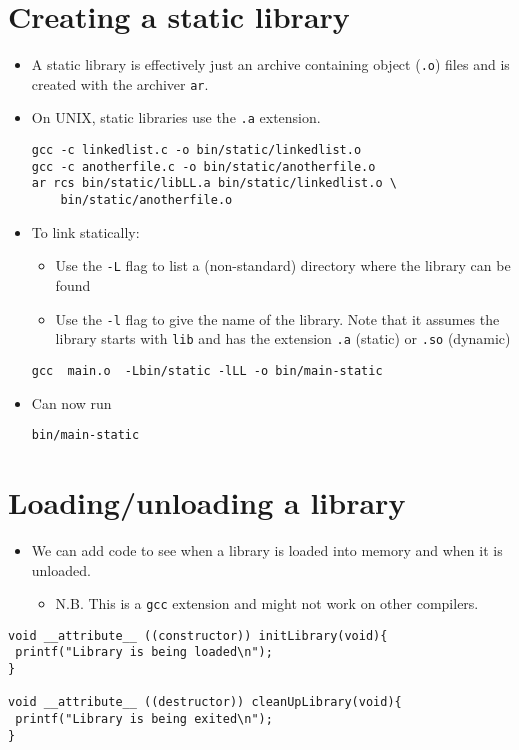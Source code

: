 \documentclass{article}
\begin{document}
\section{Creating a static library}
\begin{itemize}
\item A static library is effectively just an archive containing object (\verb!.o!) files and is created with the archiver \verb!ar!.
\item On UNIX, static libraries use the \verb!.a! extension.
\begin{verbatim}
gcc -c linkedlist.c -o bin/static/linkedlist.o
gcc -c anotherfile.c -o bin/static/anotherfile.o
ar rcs bin/static/libLL.a bin/static/linkedlist.o \
    bin/static/anotherfile.o
\end{verbatim}
\item To link statically:
\begin{itemize}
\item Use the \verb!-L! flag to list a (non-standard) directory where the library can be found
\item Use the \verb!-l! flag to give the name of the library. Note that it assumes the library starts with \verb!lib! and has the extension \verb!.a! (static) or \verb!.so! (dynamic)
\end{itemize}
\begin{verbatim}
gcc  main.o  -Lbin/static -lLL -o bin/main-static
\end{verbatim}
\item Can now run
\begin{verbatim}
bin/main-static
\end{verbatim}
\end{itemize}




\section{Loading/unloading a library}
\begin{itemize}
\item We can add code to see when a library is loaded into memory and when it is unloaded.
\begin{itemize}
\item N.B. This is a \verb!gcc! extension and might not work on other compilers.
\end{itemize}
\end{itemize}
\begin{verbatim}
void __attribute__ ((constructor)) initLibrary(void){
 printf("Library is being loaded\n");
}

void __attribute__ ((destructor)) cleanUpLibrary(void){
 printf("Library is being exited\n");
}
\end{verbatim}
\end{document}
